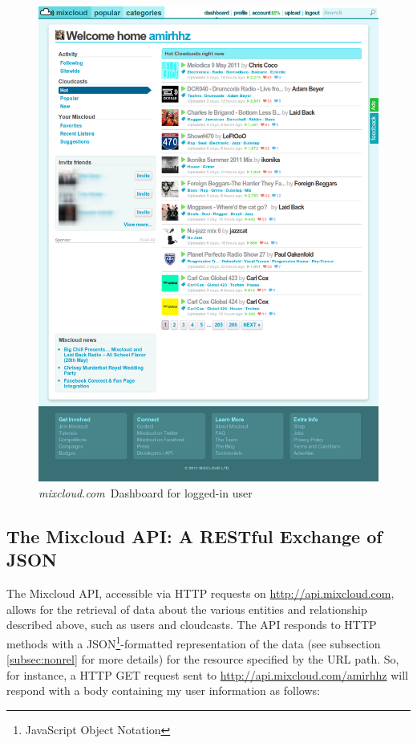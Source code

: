 \documentclass[a4paper,12pt,twoside,notitlepage]{report}
\def\mixurl{\emph{mixcloud.com}}
\begin{document}
\begin{figure}
 \centering
 \includegraphics[width=\textwidth]{./images/mixcloud-dashb.png}
 \caption{\mixurl\ Dashboard for logged-in user}
 \label{fig:mix-dash}
\end{figure}

\subsection{The Mixcloud API: A RESTful Exchange of JSON}

The Mixcloud API, accessible via HTTP requests on \url{http://api.mixcloud.com},
allows for the retrieval of data about the various entities and relationship
described above, such as users and cloudcasts. The API responds to HTTP methods
with a JSON\footnote{JavaScript Object Notation}-formatted representation of
the data (see subsection \ref{subsec:nonrel} for more details) for the resource
specified by the URL path. So, for instance, a HTTP
GET request sent to \url{http://api.mixcloud.com/amirhhz} will respond with a
body containing my user information as follows:
\end{document}

